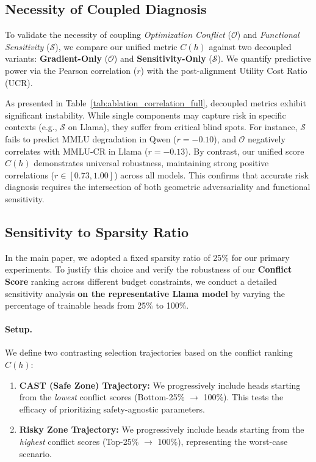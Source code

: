 \documentclass[11pt]{article}
\begin{document}





\subsection{Necessity of Coupled Diagnosis}
To validate the necessity of coupling \textit{Optimization Conflict} ($\mathcal{O}$) and \textit{Functional Sensitivity} ($\mathcal{S}$), we compare our unified metric $C(h)$ against two decoupled variants: \textbf{Gradient-Only} ($\mathcal{O}$) and \textbf{Sensitivity-Only} ($\mathcal{S}$). We quantify predictive power via the Pearson correlation ($r$) with the post-alignment Utility Cost Ratio (UCR).

As presented in Table~\ref{tab:ablation_correlation_full}, decoupled metrics exhibit significant instability. While single components may capture risk in specific contexts (e.g., $\mathcal{S}$ on Llama), they suffer from critical blind spots. For instance, $\mathcal{S}$ fails to predict MMLU degradation in Qwen ($r = -0.10$), and $\mathcal{O}$ negatively correlates with MMLU-CR in Llama ($r = -0.13$).
By contrast, our unified score $C(h)$ demonstrates universal robustness, maintaining strong positive correlations ($r \in [0.73, 1.00]$) across all models. This confirms that accurate risk diagnosis requires the intersection of both geometric adversariality and functional sensitivity.


\subsection{Sensitivity to Sparsity Ratio}
\label{sec:sparsity_sensitivity}

In the main paper, we adopted a fixed sparsity ratio of 25\% for our primary experiments. To justify this choice and verify the robustness of our \textbf{Conflict Score} ranking across different budget constraints, we conduct a detailed sensitivity analysis \textbf{on the representative Llama model} by varying the percentage of trainable heads from 25\% to 100\%.

\paragraph{Setup.} We define two contrasting selection trajectories based on the conflict ranking $C(h)$:
\begin{enumerate}
    \item \textbf{CAST (Safe Zone) Trajectory:} We progressively include heads starting from the \textit{lowest} conflict scores (Bottom-25\% $\rightarrow$ 100\%). This tests the efficacy of prioritizing safety-agnostic parameters.
    \item \textbf{Risky Zone Trajectory:} We progressively include heads starting from the \textit{highest} conflict scores (Top-25\% $\rightarrow$ 100\%), representing the worst-case scenario.
\end{enumerate}
\end{document}
